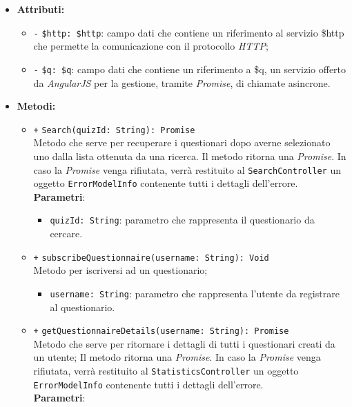 \begin{itemize}
\begin{itemize}
	\end{itemize}
	\item \textbf{Attributi:}
	\begin{itemize}
		\item \texttt{-} \texttt{\$http: \$http}: campo dati che contiene un riferimento al servizio \$http che permette la comunicazione con il protocollo \textit{HTTP};
		\item \texttt{-} \texttt{\$q: \$q}: campo dati che contiene un riferimento a \$q, un servizio offerto da \textit{AngularJS} per la gestione, tramite \textit{Promise}, di chiamate asincrone.
	\end{itemize}
	\item \textbf{Metodi:} 
	\begin{itemize}
	\item \texttt{+} \texttt{Search(quizId: String): Promise} \\Metodo che serve per recuperare i questionari dopo averne selezionato uno dalla lista ottenuta da una ricerca. Il metodo ritorna una \textit{Promise}. In caso la \textit{Promise} venga rifiutata, verrà restituito al \texttt{SearchController} un oggetto \texttt{ErrorModelInfo} contenente tutti i dettagli dell'errore. \\
	\textbf{Parametri}:
	\begin{itemize}
		\item \texttt{quizId: String}: parametro che rappresenta il questionario da cercare.
	\end{itemize}
	\item \texttt{+} \texttt{subscribeQuestionnaire(username: String): Void} \\Metodo per iscriversi ad un questionario;
	\begin{itemize}
		\item \texttt{username: String}: parametro che rappresenta l'utente da registrare al questionario.
	\end{itemize}
	\item \texttt{+} \texttt{getQuestionnaireDetails(username: String): Promise} \\Metodo che serve per ritornare i dettagli di tutti i questionari creati da un utente; Il metodo ritorna una \textit{Promise}. In caso la \textit{Promise} venga rifiutata, verrà restituito al \texttt{StatisticsController} un oggetto \texttt{ErrorModelInfo} contenente tutti i dettagli dell'errore.\\ 
     \textbf{Parametri}:
	\begin{itemize}

\end{itemize}
\end{itemize}
\end{itemize}
